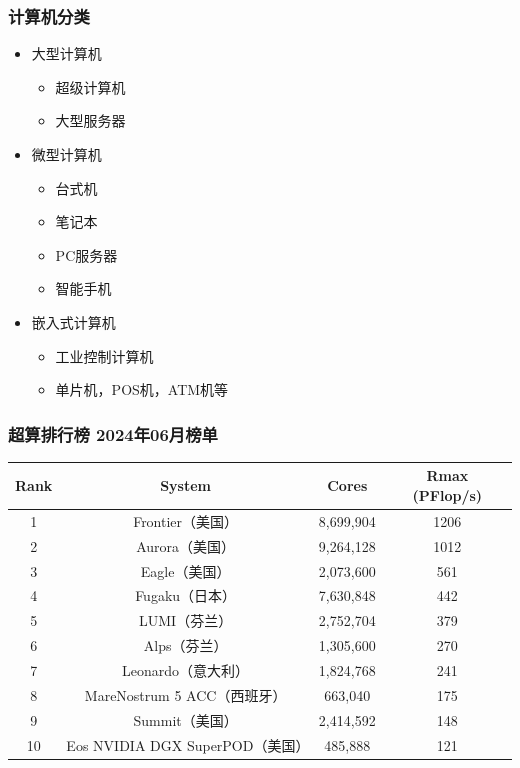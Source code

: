 \begin{frame}
    \frametitle{计算机分类}
    \begin{itemize}
      \item 大型计算机
        \begin{itemize}
          \item 超级计算机
          \item 大型服务器
        \end{itemize}
      \item 微型计算机
        \begin{itemize}
          \item 台式机
          \item 笔记本
          \item PC服务器
          \item 智能手机
        \end{itemize}
      \item 嵌入式计算机
        \begin{itemize}
          \item 工业控制计算机
          \item 单片机，POS机，ATM机等
        \end{itemize}
    \end{itemize}
\end{frame}


\begin{frame}
    \frametitle{超算排行榜 2024年06月榜单}
    \begin{table}
        \centering
        \begin{tabular}{cccc}
            \bottomrule
            Rank & System & Cores & Rmax (PFlop/s) \\ \hline
            1 & Frontier（美国） & 8,699,904 & 1206 \\ 
            2 & Aurora（美国） & 9,264,128 & 1012 \\ 
            3 & Eagle（美国） & 2,073,600 & 561 \\ 
            4 & Fugaku（日本） & 7,630,848 & 442 \\ 
            5 & LUMI（芬兰） & 2,752,704 & 379 \\ 
            6 & Alps（芬兰） & 1,305,600 & 270 \\ 
            7 & Leonardo（意大利） & 1,824,768 & 241 \\ 
            8 & MareNostrum 5 ACC（西班牙） & 663,040 & 175 \\ 
            9 & Summit（美国） & 2,414,592 & 148 \\ 
            10 & Eos NVIDIA DGX SuperPOD（美国） & 485,888 & 121 \\ \toprule
        \end{tabular}
    \end{table}
\end{frame}


